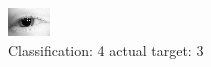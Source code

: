 \begin{figure}[h!]
\begin{center}
\includegraphics[width=0.60\columnwidth]{figures/ID96_class_4_target_3.png}
\end{center}
\caption{ Classification: 4 actual target: 3}
\label{fig:ID96_class_4_target_3}
\end{figure}
